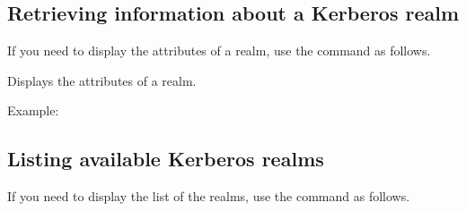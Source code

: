 \documentclass[letterpaper,10pt,english]{sphinxmanual}
\begin{document}
\subsection{Retrieving information about a Kerberos realm}
\label{\detokenize{admin/database:retrieving-information-about-a-kerberos-realm}}
If you need to display the attributes of a realm, use the
{\hyperref[\detokenize{admin/admin_commands/kdb5_ldap_util:kdb5-ldap-util-8}]{}}  command as follows.
\begin{quote}

\end{quote}

Displays the attributes of a realm.

Example:

%
\begin{sphinxVerbatim}[commandchars=\\\{\}]
    
      
  
  
 
 
 
     
     
   
\end{sphinxVerbatim}


\subsection{Listing available Kerberos realms}
\label{\detokenize{admin/database:listing-available-kerberos-realms}}
If you need to display the list of the realms, use the
{\hyperref[\detokenize{admin/admin_commands/kdb5_ldap_util:kdb5-ldap-util-8}]{}}  command as follows.
\begin{quote}

\end{quote}
\end{document}
